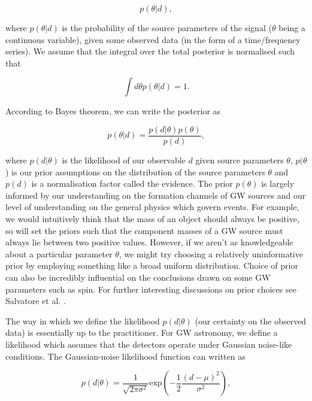 %
%
\begin{equation}
    p(\theta | d),
\end{equation}

where $p(\theta | d)$ is the probability of the source parameters of the signal ($\theta$ being a continuous variable), given some observed data (in the form of a time/frequency series). We assume that the integral over the total posterior is normalised such that 

%
%
\begin{equation}
    \int d\theta p(\theta | d) = 1.
\end{equation}

According to Bayes theorem, we can write the posterior as 

%
%
\begin{equation}
    p(\theta | d) = \frac{p(d|\theta)p(\theta)}{p(d)},
\end{equation}

%
%
where $p(d|\theta)$ is the likelihood of our observable $d$ given source parameters $\theta$, $p(\theta$) is our prior assumptions on the distribution of the source parameters $\theta$ and $p(d)$ is a normalisation factor called the evidence. The prior $p(\theta)$ is largely informed by our understanding on the formation channels of \ac{GW} sources and our level of understanding on the general physics which govern events. For example, we would intuitively think that the mass of an object should always be positive, so will set the priors such that the component masses of a \ac{GW} source must always lie between two positive values. However, if we aren't as knowledgeable about a particular parameter $\theta$, we might try choosing a relatively uninformative prior by employing something like a broad uniform distribution. Choice of prior can also be incredibly influential on the conclusions drawn on some \ac{GW} parameters such as spin. For further interesting discussions on prior choices see Salvatore et al. \cite{PhysRevLett.119.251103}.

%
%
The way in which we define the likelihood $p(d|\theta)$ (our certainty on the observed data) is essentially up to the practitioner. For \ac{GW} astronomy, we define a likelihood which assumes that the detectors operate under Gaussian noise-like conditions. The Gaussian-noise likelihood function can written as 

\begin{equation}
    p(d|\theta) = \frac{1}{\sqrt{2\pi \sigma^2}} \textrm{exp}\left(-\frac{1}{2} 
    \frac{(d - \mu)^2}{\sigma^2}\right),
\end{equation}

